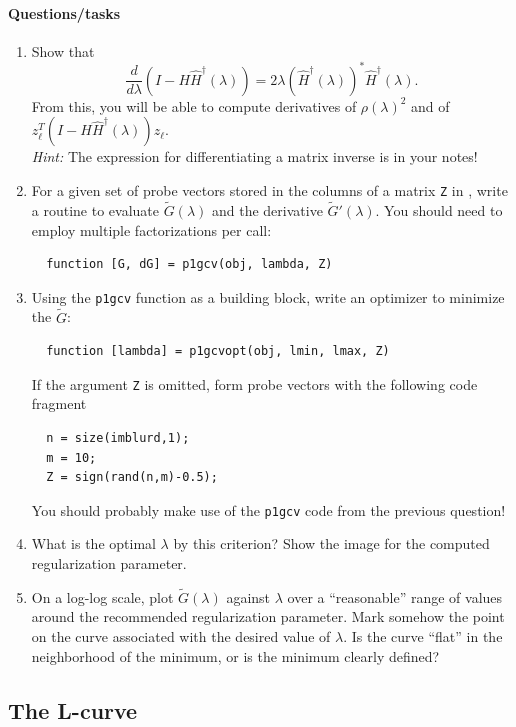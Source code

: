 \documentclass[12pt, leqno]{article} %
\begin{document}
\paragraph*{Questions/tasks}
\begin{enumerate}
\item
  Show that
  \[
    \frac{d}{d\lambda} \left( I-H \hat{H}^\dagger(\lambda) \right) =
    2\lambda( \hat{H}^\dagger(\lambda) )^* \hat{H}^\dagger(\lambda).
  \]
  From this, you will be able to compute derivatives of $\rho(\lambda)^2$
  and of $z_\ell^T (I-H \hat{H}^\dagger(\lambda)) z_{\ell}$. \\
  {\em Hint:} The expression for differentiating a matrix inverse
  is in your notes!
\item
  For a given set of probe vectors stored in the columns of a matrix
  {\tt Z} in \matlab, write a routine to evaluate $\tilde{G}(\lambda)$
  and the derivative $\tilde{G}'(\lambda)$.  You should need to employ
  multiple factorizations per call:
\begin{lstlisting}
  function [G, dG] = p1gcv(obj, lambda, Z)
\end{lstlisting}
\item
  Using the {\tt p1gcv} function as a building block, write an optimizer
  to minimize the $\tilde{G}$:
\begin{lstlisting}
  function [lambda] = p1gcvopt(obj, lmin, lmax, Z)
\end{lstlisting}
  If the argument {\tt Z} is omitted, form probe vectors with the following
  code fragment
\begin{lstlisting}
  n = size(imblurd,1);
  m = 10;
  Z = sign(rand(n,m)-0.5);
\end{lstlisting}
  You should probably make use of the {\tt p1gcv} code from the previous
  question!
\item
  What is the optimal $\lambda$ by this criterion?
  Show the image for the computed regularization parameter.
\item
  On a log-log scale, plot $\tilde{G}(\lambda)$ against $\lambda$ over
  a ``reasonable'' range of values around the recommended
  regularization parameter.  Mark somehow the point on the
  curve associated with the desired value of $\lambda$.  Is
  the curve ``flat'' in the neighborhood of the minimum, or
  is the minimum clearly defined?
\end{enumerate}

\subsection{The L-curve}
\end{document}
